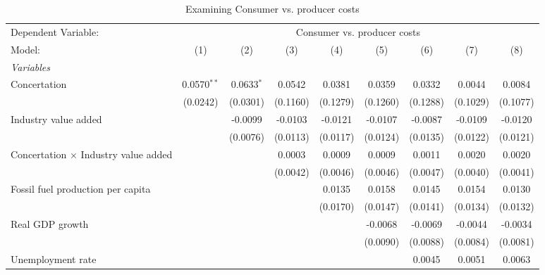 
\begin{table}[htbp]
   \caption{Examining Consumer vs. producer costs}
   \centering
   \begin{tabular}{lcccccccc}
      \tabularnewline \midrule \midrule
      Dependent Variable: & \multicolumn{8}{c}{Consumer vs. producer costs}\\
      Model:                                      & (1)           & (2)          & (3)      & (4)      & (5)      & (6)      & (7)      & (8)\\  
      \midrule
      \emph{Variables}\\
      Concertation                                & 0.0570$^{**}$ & 0.0633$^{*}$ & 0.0542   & 0.0381   & 0.0359   & 0.0332   & 0.0044   & 0.0084\\   
                                                  & (0.0242)      & (0.0301)     & (0.1160) & (0.1279) & (0.1260) & (0.1288) & (0.1029) & (0.1077)\\   
      Industry value added                        &               & -0.0099      & -0.0103  & -0.0121  & -0.0107  & -0.0087  & -0.0109  & -0.0120\\   
                                                  &               & (0.0076)     & (0.0113) & (0.0117) & (0.0124) & (0.0135) & (0.0122) & (0.0121)\\   
      Concertation $\times$ Industry value added  &               &              & 0.0003   & 0.0009   & 0.0009   & 0.0011   & 0.0020   & 0.0020\\   
                                                  &               &              & (0.0042) & (0.0046) & (0.0046) & (0.0047) & (0.0040) & (0.0041)\\   
      Fossil fuel production per capita           &               &              &          & 0.0135   & 0.0158   & 0.0145   & 0.0154   & 0.0130\\   
                                                  &               &              &          & (0.0170) & (0.0147) & (0.0141) & (0.0134) & (0.0132)\\   
      Real GDP growth                             &               &              &          &          & -0.0068  & -0.0069  & -0.0044  & -0.0034\\   
                                                  &               &              &          &          & (0.0090) & (0.0088) & (0.0084) & (0.0081)\\   
      Unemployment rate                           &               &              &          &          &          & 0.0045   & 0.0051   & 0.0063\\   

\end{tabular}
\end{table}
